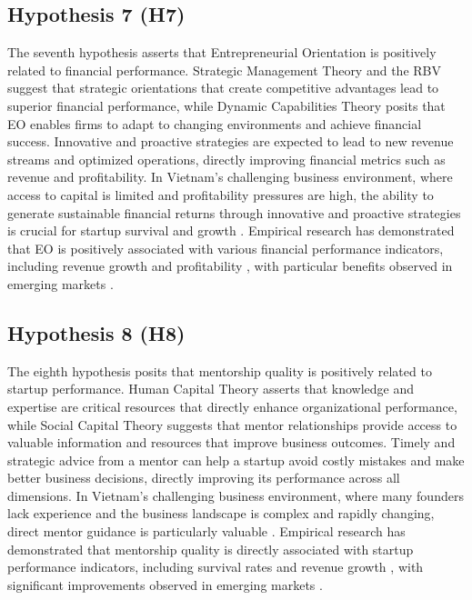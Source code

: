 \documentclass[../Main.tex]{subfiles}
\begin{document}
    \subsection{Hypothesis 7 (H7)}
    The seventh hypothesis asserts that Entrepreneurial Orientation is positively related to financial performance. Strategic Management Theory \cite{porter1980competitive} and the RBV \cite{barney1991firm} suggest that strategic orientations that create competitive advantages lead to superior financial performance, while Dynamic Capabilities Theory \cite{teece1997dynamic} posits that EO enables firms to adapt to changing environments and achieve financial success. Innovative and proactive strategies are expected to lead to new revenue streams and optimized operations, directly improving financial metrics such as revenue and profitability. In Vietnam's challenging business environment, where access to capital is limited and profitability pressures are high, the ability to generate sustainable financial returns through innovative and proactive strategies is crucial for startup survival and growth \cite{vietnam_innovation_report_2024}. Empirical research has demonstrated that EO is positively associated with various financial performance indicators, including revenue growth and profitability \cite{rauch2009entrepreneurial, saeed2014entrepreneurial}, with particular benefits observed in emerging markets \cite{wales2013entrepreneurial}.

    \subsection{Hypothesis 8 (H8)}
    The eighth hypothesis posits that mentorship quality is positively related to startup performance. Human Capital Theory \cite{becker1964human} asserts that knowledge and expertise are critical resources that directly enhance organizational performance, while Social Capital Theory \cite{coleman1988social} suggests that mentor relationships provide access to valuable information and resources that improve business outcomes. Timely and strategic advice from a mentor can help a startup avoid costly mistakes and make better business decisions, directly improving its performance across all dimensions. In Vietnam's challenging business environment, where many founders lack experience and the business landscape is complex and rapidly changing, direct mentor guidance is particularly valuable \cite{dinh2017promoting}. Empirical research has demonstrated that mentorship quality is directly associated with startup performance indicators, including survival rates and revenue growth \cite{stjean2012mentoring}, with significant improvements observed in emerging markets \cite{sullivan2011effectiveness}.
\end{document}
